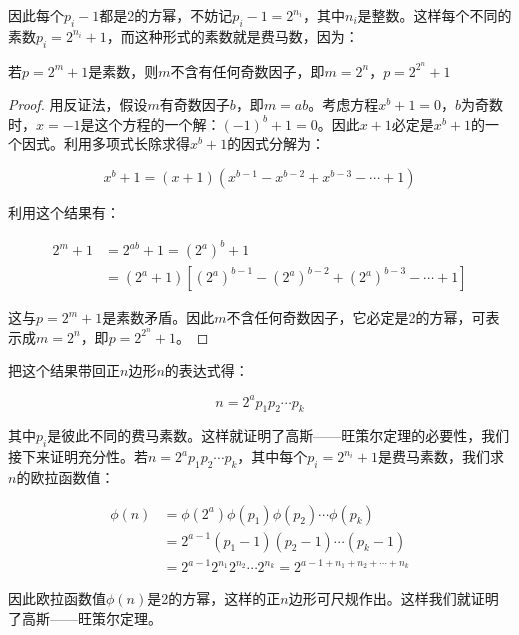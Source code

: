 因此每个$p_i - 1$都是2的方幂，不妨记$p_i - 1 = 2^{n_i}$，其中$n_i$是整数。这样每个不同的素数$p_i = 2^{n_i} + 1$，而这种形式的素数就是费马数，因为：

\begin{proposition}
若$p = 2^m + 1$是素数，则$m$不含有任何奇数因子，即$m = 2^n$，$p = 2^{2^n} + 1$
\end{proposition}

\begin{proof}
用反证法，假设$m$有奇数因子$b$，即$m = ab$。考虑方程$x^b + 1 = 0$，$b$为奇数时，$x = -1$是这个方程的一个解：$(-1)^b + 1 = 0$。因此$x + 1$必定是$x^b + 1$的一个因式。利用多项式长除求得$x^b + 1$的因式分解为：

\[
x^b + 1 = (x + 1)(x^{b-1} - x^{b-2} + x^{b-3} - \dotsb + 1)
\]

利用这个结果有：

\begin{align*}
2^m + 1 &= 2^{ab} + 1 = (2^a)^b + 1 \\
  &= (2^a + 1)[(2^a)^{b-1} - (2^a)^{b-2} + (2^a)^{b-3} - \dotsb + 1]
\end{align*}

这与$p = 2^m + 1$是素数矛盾。因此$m$不含任何奇数因子，它必定是2的方幂，可表示成$m = 2^n$，即$p = 2^{2^n} + 1$。
\end{proof}

把这个结果带回正$n$边形$n$的表达式得：

\[
n = 2^a p_1 p_2 \dotsm p_k
\]

其中$p_i$是彼此不同的费马素数。这样就证明了高斯——旺策尔定理的必要性，我们接下来证明充分性。若$n = 2^a p_1 p_2 \dotsm p_k$，其中每个$p_i = 2^{n_i} + 1$是费马素数，我们求$n$的欧拉函数值：

\begin{align*}
\phi(n) &= \phi(2^a) \phi(p_1) \phi(p_2) \dotsm \phi(p_k)  \\
   &= 2^{a - 1} (p_1 - 1) (p_2 - 1) \dotsm (p_k - 1) \\
   &= 2^{a-1} 2^{n_1} 2^{n_2} \dotsm 2^{n_k} = 2^{a - 1 + n_1 + n_2 + \dotsb + n_k}
\end{align*}

因此欧拉函数值$\phi(n)$是2的方幂，这样的正$n$边形可尺规作出。这样我们就证明了高斯——旺策尔定理。
